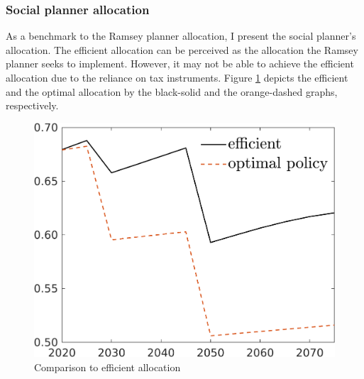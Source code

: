 \subsubsection{Social planner allocation}\label{subsec:sp_q}
As a benchmark to the Ramsey planner allocation, I present the social planner's allocation. The efficient allocation can be perceived as the allocation the Ramsey planner seeks to implement. However, it may not be able to achieve the efficient allocation due to the reliance on tax instruments. Figure \ref{fig:fb_opt} depicts the efficient and the optimal allocation by the black-solid and the orange-dashed graphs, respectively. 
\begin{figure}[h!!]
	\centering
	\caption{Comparison to efficient allocation }\label{fig:fb_opt}
	
	\begin{minipage}[]{0.32\textwidth}
		\includegraphics[width=1\textwidth]{../../codding_model/own_basedOnFried/optimalPol_190722_tidiedUp/figures/all_July22/C_CompEffOPT_T_NoTaus_regime3_opteff_spillover0_noskill0_sep1_xgrowth0_countec0_etaa0.79_lgd1_lff0.png}
	\end{minipage}
	\begin{minipage}[]{0.32\textwidth}

\end{minipage}
\end{figure}

